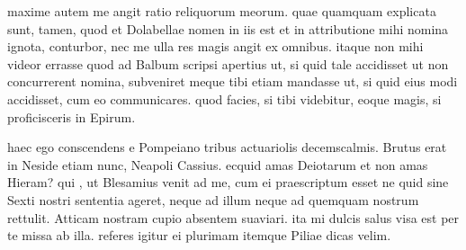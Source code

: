  maxime autem me angit ratio reliquorum meorum. quae quamquam explicata sunt, tamen, quod et Dolabellae nomen in iis est et in attributione mihi nomina ignota, conturbor, nec me ulla res magis angit ex omnibus. itaque non mihi videor errasse quod ad Balbum scripsi apertius ut, si quid tale accidisset ut non concurrerent nomina, subveniret meque tibi etiam mandasse ut, si quid eius modi accidisset, cum eo communicares. quod facies, si tibi videbitur, eoque magis, si proficisceris in Epirum.

 haec ego conscendens e Pompeiano tribus actuariolis decemscalmis. Brutus erat in Neside etiam nunc, Neapoli Cassius. ecquid amas Deiotarum et non amas Hieram? qui , ut Blesamius venit ad me, cum ei praescriptum esset ne quid sine Sexti nostri sententia ageret, neque ad illum neque ad quemquam nostrum rettulit. Atticam nostram cupio absentem suaviari. ita mi dulcis salus visa est per te missa ab illa. referes igitur ei plurimam itemque Piliae dicas velim.
